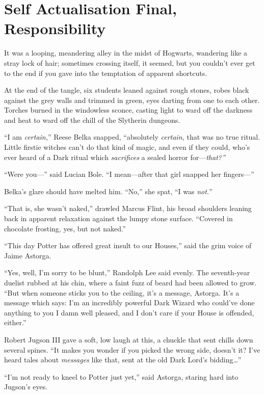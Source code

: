 \chapter{Self Actualisation Final,
Responsibility}\label{self-actualisation-final-responsibility}

It was a looping, meandering alley in the midst of Hogwarts, wandering
like a stray lock of hair; sometimes crossing itself, it seemed, but you
couldn't ever get to the end if you gave into the temptation of apparent
shortcuts.

At the end of the tangle, six students leaned against rough stones,
robes black against the grey walls and trimmed in green, eyes darting
from one to each other. Torches burned in the windowless sconce, casting
light to ward off the darkness and heat to ward off the chill of the
Slytherin dungeons.

``I am \emph{certain,}'' Reese Belka snapped, ``absolutely
\emph{certain,} that was no true ritual. Little firstie witches can't do
that kind of magic, and even if they could, who's ever heard of a Dark
ritual which \emph{sacrifices} a sealed horror for---\emph{that?''}

``Were you---'' said Lucian Bole. ``I mean---after that girl snapped her
fingers---''

Belka's glare should have melted him. ``No,'' she spat, ``I was
\emph{not.}''

``That is, she wasn't naked,'' drawled Marcus Flint, his broad shoulders
leaning back in apparent relaxation against the lumpy stone surface.
``Covered in chocolate frosting, yes, but not naked.''

``This day Potter has offered great insult to our Houses,'' said the
grim voice of Jaime Astorga.

``Yes, well, I'm sorry to be blunt,'' Randolph Lee said evenly. The
seventh-year duelist rubbed at his chin, where a faint fuzz of beard had
been allowed to grow. ``But when someone sticks you to the ceiling, it's
a message, Astorga. It's a message which says: I'm an incredibly
powerful Dark Wizard who could've done anything to you I damn well
pleased, and I don't care if your House is offended, either.''

Robert Jugson III gave a soft, low laugh at this, a chuckle that sent
chills down several spines. ``It makes you wonder if you picked the
wrong side, doesn't it? I've heard tales about \emph{messages} like
that, sent at the old Dark Lord's bidding\ldots{}''

``I'm not ready to kneel to Potter just yet,'' said Astorga, staring
hard into Jugson's eyes.

